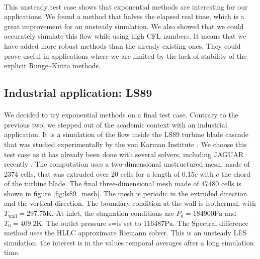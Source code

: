       \paragraph{}
      This unsteady test case shows that exponential methods are interesting for our applications.
      We found a method that halves the elapsed real time, which is a great improvement for an unsteady simulation.
      We also showed that we could accurately simulate this flow while using high CFL numbers.
      It means that we have added more robust methods than the already existing ones.
      They could prove useful in applications where we are limited by the lack of stability of the explicit Runge--Kutta methods.


    \subsection{Industrial application: LS89}


      \paragraph{}
      We decided to try exponential methods on a final test case.
      Contrary to the previous two, we stepped out of the academic context with an industrial application.
      It is a simulation of the flow inside the LS89 turbine blade cascade that was studied experimentally by the von Karman Institute \cite{ArtsLambertdeRouvroit1992}.
      We choose this test case as it has already been done with several solvers, including JAGUAR recently \cite{BrunetCronerMinotEtAl2018}.
      The computation uses a two-dimensional unstructured mesh, made of \num{2374} cells, that was extruded over 20 cells for a length of $0.15 c$ with $c$ the chord of the turbine blade.
      The final three-dimensional mesh made of \num{47480} cells is shown in figure \ref{fig:ls89_mesh}.
      The mesh is periodic in the extruded direction and the vertical direction.
      The boundary condition at the wall is isothermal, with $T_\textrm{wall} = 297.75 \si{\kelvin}$.
      At inlet, the stagnation conditions are $P_0 = \num{184900}\si{\pascal}$ and $T_0 = 409.2\si{\kelvin}$.
      The outlet pressure s=is set to $\num{116487}\si{\pascal}$.
      The Spectral difference method uses the HLLC approximate Riemann solver.
      This is an unsteady LES simulation: the interest is in the values temporal averages after a long simulation time.

